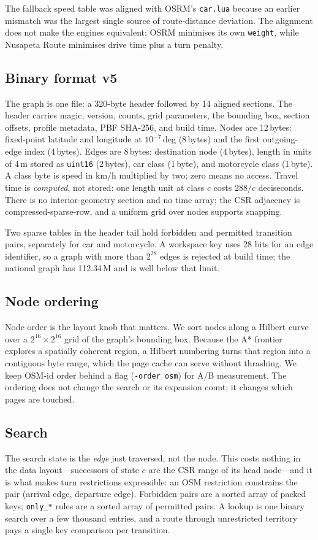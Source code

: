 \documentclass[sigconf,nonacm]{acmart}
\begin{document}
The fallback speed table was aligned with OSRM's \texttt{car.lua} because an
earlier mismatch was the largest single source of route-distance deviation. The
alignment does not make the engines equivalent: OSRM minimises its own
\texttt{weight}, while Nusapeta Route minimises drive time plus a turn penalty.

\subsection{Binary format v5}
The graph is one file: a 320-byte header followed by 14 aligned sections. The
header carries magic, version, counts, grid parameters, the bounding box, section
offsets, profile metadata, PBF SHA-256, and build time. Nodes are 12\,bytes:
fixed-point latitude and longitude at $10^{-7}$\,deg (8\,bytes) and the first
outgoing-edge index (4\,bytes). Edges are 8\,bytes: destination node (4\,bytes),
length in units of 4\,m stored as \texttt{uint16} (2\,bytes), car class
(1\,byte), and motorcycle class (1\,byte). A class byte is speed in km/h
multiplied by two; zero means no access. Travel time is \emph{computed}, not
stored: one length unit at class $c$ costs $288/c$ deciseconds. There is no
interior-geometry section and no time array; the CSR adjacency is
compressed-sparse-row, and a uniform grid over nodes supports snapping.

Two sparse tables in the header tail hold forbidden and permitted transition
pairs, separately for car and motorcycle. A workspace key uses 28 bits for an
edge identifier, so a graph with more than $2^{28}$ edges is rejected at build
time; the national graph has 112.34\,M and is well below that limit.

\subsection{Node ordering}
Node order is the layout knob that matters. We sort nodes along a Hilbert curve
over a $2^{16}\times2^{16}$ grid of the graph's bounding box. Because the A*
frontier explores a spatially coherent region, a Hilbert numbering turns that
region into a contiguous byte range, which the page cache can serve without
thrashing. We keep OSM-id order behind a flag (\texttt{-order osm}) for A/B
measurement. The ordering does not change the search or its expansion count; it
changes which pages are touched.

\subsection{Search}
The search state is the \emph{edge} just traversed, not the node. This costs
nothing in the data layout---successors of state $e$ are the CSR range of its head
node---and it is what makes turn restrictions expressible: an OSM restriction
constrains the pair (arrival edge, departure edge). Forbidden pairs are a sorted
array of packed keys; \texttt{only\_*} rules are a sorted array of permitted
pairs. A lookup is one binary search over a few thousand entries, and a route
through unrestricted territory pays a single key comparison per transition.
\end{document}
